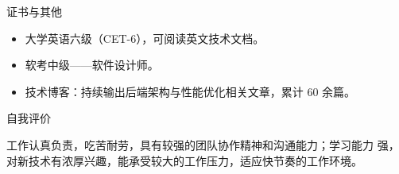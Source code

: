 \documentclass[10.5pt,fontset=windows]{ctexart}
\newcommand{\rsection}[1]{%
  \vspace{9pt}%
  {\color{maincolor}\heiti\zihao{4}#1}\par
  \vspace{1pt}{\color{maincolor}\rule{\textwidth}{1pt}}\par
  \vspace{3pt}}
\begin{document}
\rsection{证书与其他}
\begin{itemize}
  \item 大学英语六级（CET-6），可阅读英文技术文档。
  \item 软考中级——软件设计师。
  \item 技术博客：持续输出后端架构与性能优化相关文章，累计 60 余篇。
\end{itemize}

\rsection{自我评价}
工作认真负责，吃苦耐劳，具有较强的团队协作精神和沟通能力；学习能力 强，对新技术有浓厚兴趣，能承受较大的工作压力，适应快节奏的工作环境。
\end{document}
